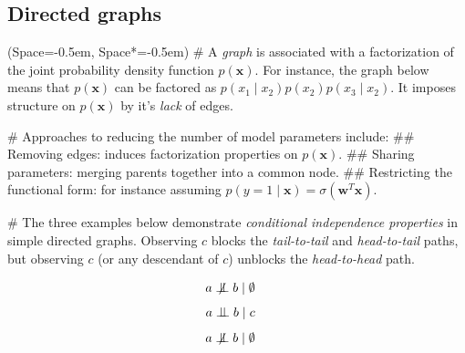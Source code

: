 \documentclass[12pt, a4paper]{article}
\newcommand{\listSpace}{-0.5em}%
\newcommand{\vect}[1]{\bm{#1}}
\newcommand{\bigCI}{\mathrel{\text{\scalebox{1.07}{$\perp\mkern-10mu\perp$}}}}
\newcommand{\nbigCI}{\centernot{\bigCI}}
\begin{document}
\subsection*{Directed graphs}
\begin{easylist}[itemize]
	\ListProperties(Space=\listSpace, Space*=\listSpace)
	# A \emph{graph} is associated with a factorization of the joint probability density function $p(\vect{x})$.
	For instance, the graph below means that $p(\vect{x})$ can be factored as $p(x_1 \mid x_2) p(x_2) p(x_3 \mid x_2)$.
	It imposes structure on $p(\vect{x})$ by it's \emph{lack} of edges.
	\begin{figure}[ht!]
		\centering
	\end{figure}
	# Approaches to reducing the number of model parameters include:
	## Removing edges: induces factorization properties on $p(\vect{x})$.
	## Sharing parameters: merging parents together into a common node.
	## Restricting the functional form: for instance assuming $p(y=1\mid \vect{x}) = \sigma \left( \vect{w}^T \vect{x} \right)$.

# The three examples below demonstrate \emph{conditional independence properties} in simple directed graphs.
Observing $c$ blocks the \emph{tail-to-tail} and \emph{head-to-tail} paths, but observing $c$ (or any descendant of $c$) unblocks the \emph{head-to-head} path.
\begin{figure}[!htb]
	\centering
	\begin{align*}
	a \nbigCI b &\mid \emptyset
	\end{align*}
	\begin{align*}
		a \bigCI b &\mid c
	\end{align*}
	\endminipage
	\begin{align*}
		a \nbigCI b &\mid \emptyset
	\end{align*}
	

\end{figure}
\end{easylist}
\end{document}
